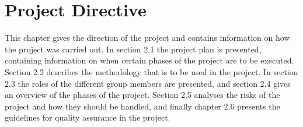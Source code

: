 \chapter{Project Directive}

This chapter gives the direction of the project and contains information on how the 
project was carried out. In section 2.1 the project plan is presented, containing 
information on when certain phases of the project are to be executed. Section 2.2 describes 
the methodology that is to be used in the project. In section 2.3 the roles of the 
different group members are presented, and section 2.4 gives an overview of the phases of the project. 
Section 2.5 analyses the risks of the project and how they should be handled, and finally chapter 2.6 
presents the guidelines for quality assurance in the project.